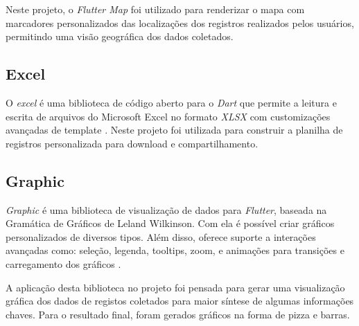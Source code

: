  Neste projeto, o \textit{Flutter Map} foi utilizado para renderizar o mapa
 com marcadores personalizados das localizações dos registros realizados 
 pelos usuários, permitindo uma visão geográfica dos dados coletados.

\subsection{Excel}

O \textit{excel} é uma biblioteca de código aberto para o
\textit{Dart} que permite a leitura e escrita de arquivos do Microsoft Excel 
no formato \textit{XLSX} com customizações avançadas de template \cite{excel_flutter}.
Neste projeto foi utilizada para construir a planilha de registros personalizada para download e compartilhamento.

\subsection{Graphic}

\textit{Graphic} é uma biblioteca de visualização de dados para \textit{Flutter}, 
baseada 
na Gramática de Gráficos de Leland Wilkinson. Com ela é possível criar gráficos 
personalizados de diversos tipos. Além disso, oferece suporte 
a interações avançadas como: seleção, legenda, tooltips, zoom, e animações 
para transições e carregamento dos gráficos \cite{graphic_flutter}.

A aplicação desta biblioteca no projeto foi pensada para gerar uma 
visualização gráfica dos dados de registos coletados para maior síntese de
algumas informações chaves.
Para o resultado final, foram gerados gráficos na forma de pizza e barras.



